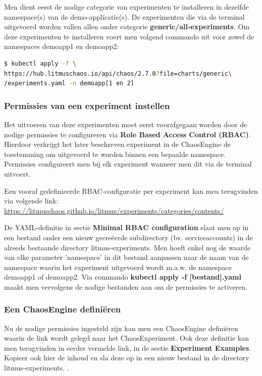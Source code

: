 Men dient eerst de nodige categorie van experimenten te installeren in dezelfde namespace(s) van de demo-applicatie(s). De experimenten die via de terminal uitgevoerd worden vallen allen onder categorie {\bf generic/all-experiments}. \newline Om deze experimenten te installeren voert men volgend commando uit voor zowel de namespaces demoapp1 en demoapp2:
\begin{lstlisting}[language=bash]
$ kubectl apply -f \
https://hub.litmuschaos.io/api/chaos/2.7.0?file=charts/generic\
/experiments.yaml -n demoapp[1 en 2]
\end{lstlisting}

\subsubsection{Permissies van een experiment instellen}

Het uitvoeren van deze experimenten moet eerst voorafgegaan worden door de nodige permissies te configureren via {\bf Role Based Access Control (RBAC)}. Hierdoor verkrijgt het later beschreven experiment in de ChaosEngine de toestemming om uitgevoerd te worden binnen een bepaalde namespace. Permissies configureert men bij elk experiment wanneer men dit via de terminal uitvoert. 

Een vooraf gedefinieerde RBAC-configuratie per experiment kan men terugvinden via volgende link: \url{https://litmuschaos.github.io/litmus/experiments/categories/contents/}

De YAML-definitie in sectie {\bf Minimal RBAC configuration} slaat men op in een bestand onder een nieuw gecreëerde subdirectory (bv. serviceaccounts) in de alreeds bestaande directory litmus-experiments. Men hoeft enkel nog de waarde van elke parameter 'namespace' in dit bestand aanpassen naar de naam van de namespace waarin het experiment uitgevoerd wordt m.a.w. de namespace demoapp1 of demoapp2. \newline Via commando {\bf kubectl apply -f [bestand].yaml} maakt men vervolgens de nodige bestanden aan om de permissies te activeren.  

\subsubsection{Een ChaosEngine definiëren}

Nu de nodige permissies ingesteld zijn kan men een ChaosEngine definiëren waarin de link wordt gelegd naar het ChaosExperiment. Ook deze definitie kan men terugvinden in eerder vermelde link, in de sectie {\bf Experiment Examples}. Kopieer ook hier de inhoud en sla deze op in een nieuw bestand in de directory litmus-experiments. \autocite{Experiments2022}. 

